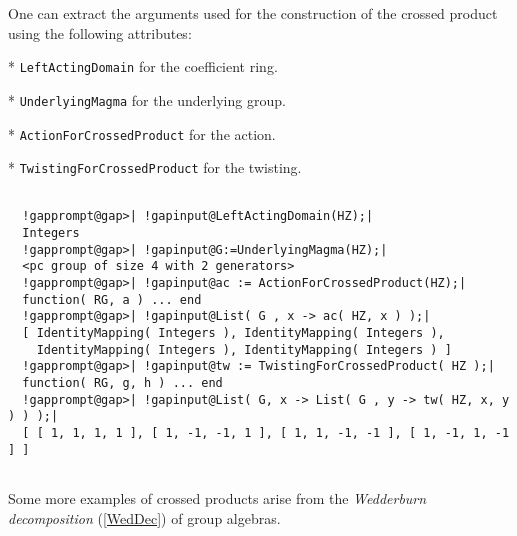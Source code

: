 \documentclass[a4paper,11pt]{report}
\begin{document}
{{{\begin{Verbatim}[commandchars=!@|,fontsize=\small,frame=single,label=Example]
\end{Verbatim}
 One can extract the arguments used for the construction of the crossed product
using the following attributes: 

 *  \texttt{LeftActingDomain} for the coefficient ring. 

 *  \texttt{UnderlyingMagma} for the underlying group. 

 *  \texttt{ActionForCrossedProduct} for the action. 

 *  \texttt{TwistingForCrossedProduct} for the twisting. 
\begin{Verbatim}[commandchars=!@|,fontsize=\small,frame=single,label=Example]
  
  !gapprompt@gap>| !gapinput@LeftActingDomain(HZ);|
  Integers
  !gapprompt@gap>| !gapinput@G:=UnderlyingMagma(HZ);|
  <pc group of size 4 with 2 generators>
  !gapprompt@gap>| !gapinput@ac := ActionForCrossedProduct(HZ);|
  function( RG, a ) ... end
  !gapprompt@gap>| !gapinput@List( G , x -> ac( HZ, x ) );|
  [ IdentityMapping( Integers ), IdentityMapping( Integers ),
    IdentityMapping( Integers ), IdentityMapping( Integers ) ]
  !gapprompt@gap>| !gapinput@tw := TwistingForCrossedProduct( HZ );|
  function( RG, g, h ) ... end
  !gapprompt@gap>| !gapinput@List( G, x -> List( G , y -> tw( HZ, x, y ) ) );|
  [ [ 1, 1, 1, 1 ], [ 1, -1, -1, 1 ], [ 1, 1, -1, -1 ], [ 1, -1, 1, -1 ] ]  
  
\end{Verbatim}
 Some more examples of crossed products arise from the \emph{Wedderburn decomposition} (\ref{WedDec}) of group algebras. 
\begin{Verbatim}[commandchars=!@|,fontsize=\small,frame=single,label=Example]
  

\end{Verbatim}}}}
\end{document}
